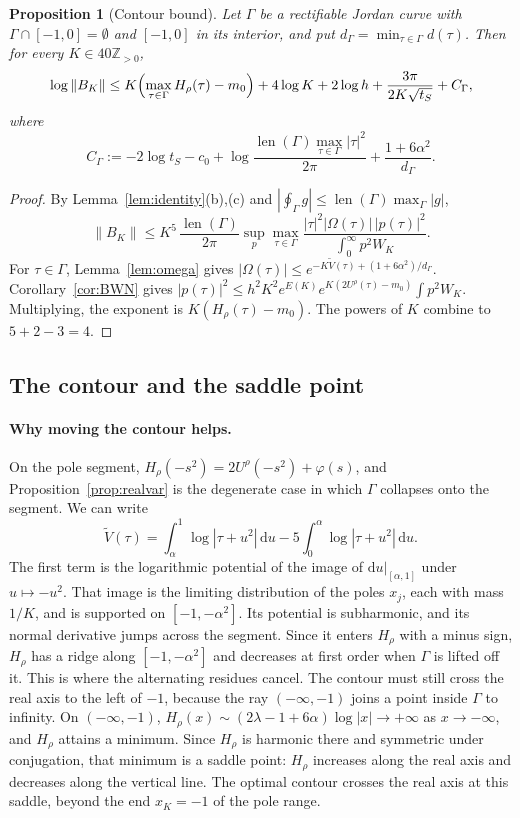 \documentclass[11pt]{article}
\newtheorem{proposition}{Proposition}
\theoremstyle{remark}
\newcommand{\Z}{\mathbb{Z}}
\newcommand{\Vt}{\widetilde{V}}
\newcommand{\dd}{\mathrm{d}}
\DeclareMathOperator{\len}{len}
\begin{document}
\begin{proposition}[Contour bound]\label{prop:contour}
Let $\Gamma$ be a rectifiable Jordan curve with $\Gamma\cap[-1,0]=\emptyset$ and $[-1,0]$ in its interior, and put $d_\Gamma=\min_{\tau\in\Gamma}d(\tau)$. Then for every $K\in40\Z_{>0}$,
\[
\log\|B_K\|\le K\Bigl(\max_{\tau\in\Gamma}H_\rho(\tau)-m_0\Bigr)+4\log K+2\log h+\frac{3\pi}{2K\sqrt{t_S}}+C_\Gamma,
\]
where
\[
C_\Gamma:=-2\log t_S-c_0+\log\frac{\len(\Gamma)\max_{\tau\in\Gamma}|\tau|^2}{2\pi}+\frac{1+6\alpha^2}{d_\Gamma}.
\]
\end{proposition}

\begin{proof}
By Lemma~\ref{lem:identity}(b),(c) and $|\oint_\Gamma g|\le\len(\Gamma)\max_\Gamma|g|$,
\[
\|B_K\|\le K^5\,\frac{\len(\Gamma)}{2\pi}\sup_p\max_{\tau\in\Gamma}\frac{|\tau|^2|\Omega(\tau)|\,|p(\tau)|^2}{\int_0^\infty p^2W_K}.
\]
For $\tau\in\Gamma$, Lemma~\ref{lem:omega} gives $|\Omega(\tau)|\le e^{-K\Vt(\tau)+(1+6\alpha^2)/d_\Gamma}$. Corollary~\ref{cor:BWN} gives $|p(\tau)|^2\le h^2K^2e^{E(K)}e^{K(2U^\rho(\tau)-m_0)}\int p^2W_K$. Multiplying, the exponent is $K(H_\rho(\tau)-m_0)$. The powers of $K$ combine to $5+2-3=4$.
\end{proof}

\subsection{The contour and the saddle point}\label{sec:saddle}

\paragraph{Why moving the contour helps.} On the pole segment, $H_\rho(-s^2)=2U^\rho(-s^2)+\varphi(s)$, and Proposition~\ref{prop:realvar} is the degenerate case in which $\Gamma$ collapses onto the segment. We can write
\[
\Vt(\tau)=\int_\alpha^1\log|\tau+u^2|\,\dd u-5\int_0^\alpha\log|\tau+u^2|\,\dd u .
\]
The first term is the logarithmic potential of the image of $\dd u|_{[\alpha,1]}$ under $u\mapsto-u^2$. That image is the limiting distribution of the poles $x_j$, each with mass $1/K$, and is supported on $[-1,-\alpha^2]$. Its potential is subharmonic, and its normal derivative jumps across the segment. Since it enters $H_\rho$ with a minus sign, $H_\rho$ has a ridge along $[-1,-\alpha^2]$ and decreases at first order when $\Gamma$ is lifted off it. This is where the alternating residues cancel. The contour must still cross the real axis to the left of $-1$, because the ray $(-\infty,-1)$ joins a point inside $\Gamma$ to infinity. On $(-\infty,-1)$, $H_\rho(x)\sim(2\lambda-1+6\alpha)\log|x|\to+\infty$ as $x\to-\infty$, and $H_\rho$ attains a minimum. Since $H_\rho$ is harmonic there and symmetric under conjugation, that minimum is a saddle point: $H_\rho$ increases along the real axis and decreases along the vertical line. The optimal contour crosses the real axis at this saddle, beyond the end $x_K=-1$ of the pole range.
\end{document}
